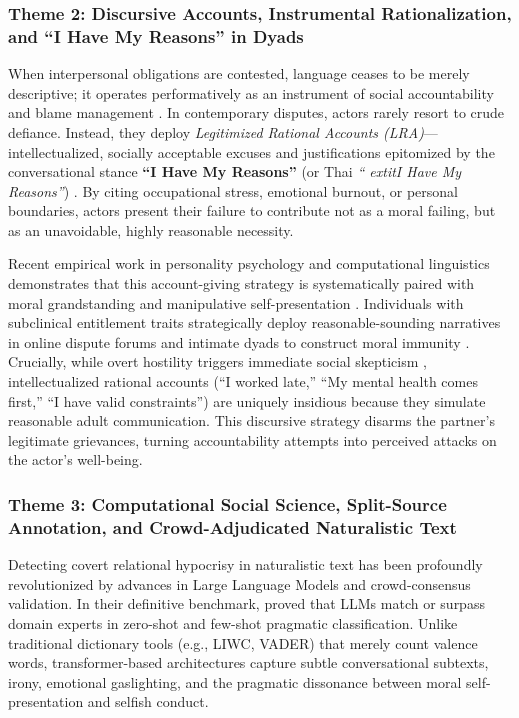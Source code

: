 \subsubsection{Theme 2: Discursive Accounts, Instrumental Rationalization, and ``I Have My Reasons'' in Dyads}
When interpersonal obligations are contested, language ceases to be merely descriptive; it operates performatively as an instrument of social accountability and blame management \citep{scott1968accounts,edwards1992discursive,billig1996arguing}. In contemporary disputes, actors rarely resort to crude defiance. Instead, they deploy \textit{Legitimized Rational Accounts (LRA)}---intellectualized, socially acceptable excuses and justifications epitomized by the conversational stance \textbf{``I Have My Reasons''} (or Thai \textit{``	extit{I Have My Reasons''}}) \citep{bandura1999moral}. By citing occupational stress, emotional burnout, or personal boundaries, actors present their failure to contribute not as a moral failing, but as an unavoidable, highly reasonable necessity.

Recent empirical work in personality psychology and computational linguistics demonstrates that this account-giving strategy is systematically paired with moral grandstanding and manipulative self-presentation \citep{savejnarong2022interpersonal,grubbs2022moral}. Individuals with subclinical entitlement traits strategically deploy reasonable-sounding narratives in online dispute forums and intimate dyads to construct moral immunity \citep{cerulli2026dark}. Crucially, while overt hostility triggers immediate social skepticism \citep{aquino2025reputational,bates2024virtuous}, intellectualized rational accounts (``I worked late,'' ``My mental health comes first,'' ``I have valid constraints'') are uniquely insidious because they simulate reasonable adult communication. This discursive strategy disarms the partner's legitimate grievances, turning accountability attempts into perceived attacks on the actor's well-being.

\subsubsection{Theme 3: Computational Social Science, Split-Source Annotation, and Crowd-Adjudicated Naturalistic Text}
Detecting covert relational hypocrisy in naturalistic text has been profoundly revolutionized by advances in Large Language Models and crowd-consensus validation. In their definitive benchmark, \citet{ziems2024large} proved that LLMs match or surpass domain experts in zero-shot and few-shot pragmatic classification. Unlike traditional dictionary tools (e.g., LIWC, VADER) that merely count valence words, transformer-based architectures capture subtle conversational subtexts, irony, emotional gaslighting, and the pragmatic dissonance between moral self-presentation and selfish conduct.

